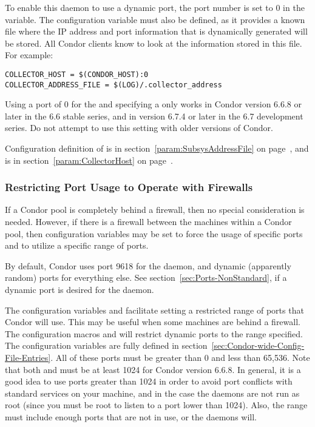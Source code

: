 To enable this daemon to use a dynamic port,
the port number is set to 0 in the 
variable.
The 
configuration variable must also be defined,
as it provides a known file where the IP address
and port information that is dynamically generated will be stored.
All Condor clients know to look at the
information stored in this file.
For example:
\footnotesize
\begin{verbatim}
COLLECTOR_HOST = $(CONDOR_HOST):0
COLLECTOR_ADDRESS_FILE = $(LOG)/.collector_address
\end{verbatim}
\normalsize

\Note Using a port of 0 for the 
and specifying a
only works in Condor version 6.6.8 or later in the 6.6 stable series,
and in version 6.7.4 or later in the 6.7 development series.
Do not attempt to use this setting with older versions of Condor.

Configuration definition of 
is in section~\ref{param:SubsysAddressFile} on
page~\pageref{param:SubsysAddressFile},
and
is in
section~\ref{param:CollectorHost} on
page~\pageref{param:CollectorHost}.


\subsubsection{\label{sec:Ports-Firewalls}Restricting Port Usage to
 Operate with Firewalls}

If a Condor pool is completely behind a firewall,
then no special consideration is needed.
However, if there is a firewall between the machines within
a Condor pool, then
configuration variables may be set to force the usage of
specific ports and to utilize a specific range of ports.

By default,
Condor uses port 9618 for the  daemon,
and dynamic (apparently random) ports for everything else.
See section~\ref{sec:Ports-NonStandard},
if a dynamic port is desired for the
 daemon.

The configuration variables
 and  facilitate setting a restricted
range of ports that Condor will use.
This may be useful when some machines are behind a firewall.
The configuration macros
 and  
will restrict dynamic ports to the range specified.
The configuration variables are fully defined
in section~\ref{sec:Condor-wide-Config-File-Entries}.
All of these ports must be greater than 0 and less than 65,536.
Note that both  and  must be at 
least 1024 for Condor version 6.6.8.
In general, it is a good idea to use ports greater than 1024 in order
to avoid port conflicts with standard services on your machine, and in
the case the daemons are not run as root (since you must be root to
listen to a port lower than 1024).
Also, the range must include enough ports that are not in use, or the
daemons will.

